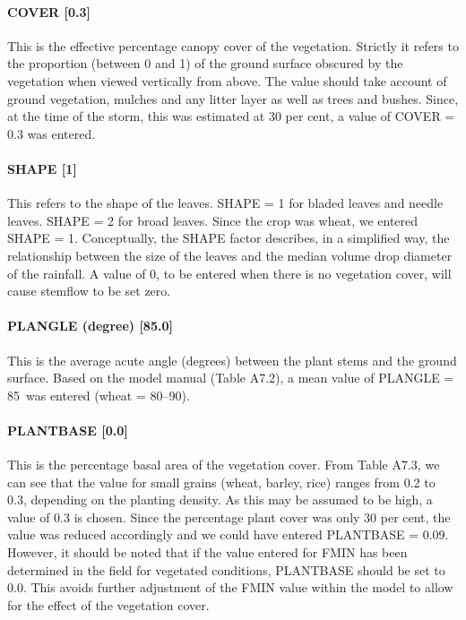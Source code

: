  
\paragraph{COVER [0.3]}
This is the effective percentage canopy cover of the vegetation. Strictly it refers to the proportion (between 0 and 1) of the ground surface obscured by the vegetation when viewed vertically from above. The value should take account of ground vegetation, mulches and any litter layer as well as trees and bushes. Since, at the time of the storm, this was estimated at 30 per cent, a value of COVER = 0.3 was entered.
 
\paragraph{SHAPE [1]}
This refers to the shape of the leaves. SHAPE = 1 for bladed leaves and needle leaves. SHAPE = 2 for broad leaves. Since the crop was wheat, we entered SHAPE = 1. Conceptually, the SHAPE factor describes, in a simplified way, the relationship between the size of the leaves and the median volume drop diameter of the rainfall. A value of 0, to be entered when there is no vegetation cover, will cause stemflow to be set zero.

\paragraph{PLANGLE (degree) [85.0]}
This is the average acute angle (degrees) between the plant stems and the ground surface. Based on the model manual (Table A7.2), a mean value of PLANGLE = 85\textdegree\ was entered (wheat = 80--90).
 
\paragraph{PLANTBASE [0.0]}
This is the percentage basal area of the vegetation cover. From Table A7.3, we can see that the value for small grains (wheat, barley, rice) ranges from 0.2 to 0.3, depending on the planting density. As this may be assumed to be high, a value of 0.3 is chosen. Since the percentage plant cover was only 30 per cent, the value was reduced accordingly and we could have entered PLANTBASE = 0.09. However, it should be noted that if the value entered for FMIN has been determined in the field for vegetated conditions, PLANTBASE should be set to 0.0. This avoids further adjustment of the FMIN value within the model to allow for the effect of the vegetation cover.
 
